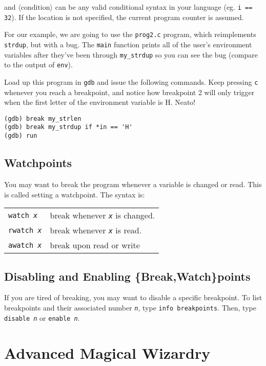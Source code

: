 \documentclass[11pt]{article}
\begin{document}
and $\langle \mathrm{condition} \rangle$ can be any valid conditional syntax in
your language (eg. \texttt{i == 32}). If the location is not specified, the
current program counter is assumed.

For our example, we are going to use the \texttt{prog2.c} program, which
reimplements \texttt{strdup}, but with a bug. The \texttt{main} function prints
all of the user's environment variables after they've been through
\texttt{my\_strdup} so you can see the bug (compare to the output of
\texttt{env}).

Load up this program in \texttt{gdb} and issue the following commands. Keep
pressing \texttt{c} whenever you reach a breakpoint, and notice how breakpoint
2 will only trigger when the first letter of the environment variable is H.
Neato!

\begin{termbox}
\begin{verbatim}
(gdb) break my_strlen
(gdb) break my_strdup if *in == 'H'
(gdb) run
\end{verbatim}
\end{termbox}

\subsection{Watchpoints}
You may want to break the program whenever a variable is changed or read. This
is called setting a watchpoint. The syntax is:

\begin{tabular}{l l}
    \texttt{watch \emph{x}} & break whenever \texttt{\emph{x}} is changed. \\
    \texttt{rwatch \emph{x}} & break whenever \texttt{\emph{x}} is read. \\
    \texttt{awatch \emph{x}} & break upon read or write \\
\end{tabular}

\subsection{Disabling and Enabling \{Break,Watch\}points}

If you are tired of breaking, you may want to disable a specific breakpoint. To
list breakpoints and their associated number \texttt{\emph{n}}, type
\texttt{info breakpoints}. Then, type \texttt{disable \emph{n}} or
\texttt{enable \emph{n}}.

\section{Advanced Magical Wizardry}
\end{document}
